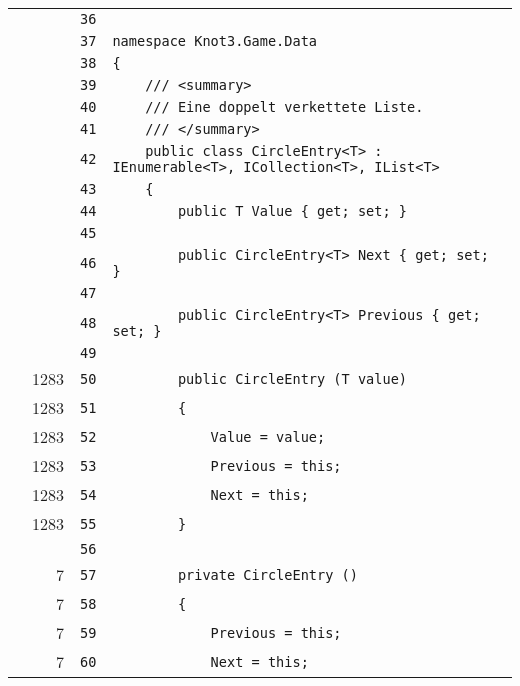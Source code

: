 \documentclass[a4paper,10pt]{article}
\begin{document}
\begin{longtable}[l]{lrrl}
\cellcolor{gray} &  & \verb~36~ & \verb~~\\
\cellcolor{gray} &  & \verb~37~ & \verb~namespace Knot3.Game.Data~\\
\cellcolor{gray} &  & \verb~38~ & \verb~{~\\
\cellcolor{gray} &  & \verb~39~ & \verb~    /// <summary>~\\
\cellcolor{gray} &  & \verb~40~ & \verb~    /// Eine doppelt verkettete Liste.~\\
\cellcolor{gray} &  & \verb~41~ & \verb~    /// </summary>~\\
\cellcolor{gray} &  & \verb~42~ & \verb~    public class CircleEntry<T> : IEnumerable<T>, ICollection<T>, IList<T>~\\
\cellcolor{gray} &  & \verb~43~ & \verb~    {~\\
\cellcolor{gray} &  & \verb~44~ & \verb~        public T Value { get; set; }~\\
\cellcolor{gray} &  & \verb~45~ & \verb~~\\
\cellcolor{gray} &  & \verb~46~ & \verb~        public CircleEntry<T> Next { get; set; }~\\
\cellcolor{gray} &  & \verb~47~ & \verb~~\\
\cellcolor{gray} &  & \verb~48~ & \verb~        public CircleEntry<T> Previous { get; set; }~\\
\cellcolor{gray} &  & \verb~49~ & \verb~~\\
\cellcolor{green} & 1283 & \verb~50~ & \verb~        public CircleEntry (T value)~\\
\cellcolor{green} & 1283 & \verb~51~ & \verb~        {~\\
\cellcolor{green} & 1283 & \verb~52~ & \verb~            Value = value;~\\
\cellcolor{green} & 1283 & \verb~53~ & \verb~            Previous = this;~\\
\cellcolor{green} & 1283 & \verb~54~ & \verb~            Next = this;~\\
\cellcolor{green} & 1283 & \verb~55~ & \verb~        }~\\
\cellcolor{gray} &  & \verb~56~ & \verb~~\\
\cellcolor{green} & 7 & \verb~57~ & \verb~        private CircleEntry ()~\\
\cellcolor{green} & 7 & \verb~58~ & \verb~        {~\\
\cellcolor{green} & 7 & \verb~59~ & \verb~            Previous = this;~\\
\cellcolor{green} & 7 & \verb~60~ & \verb~            Next = this;~\\

\end{longtable}
\end{document}
